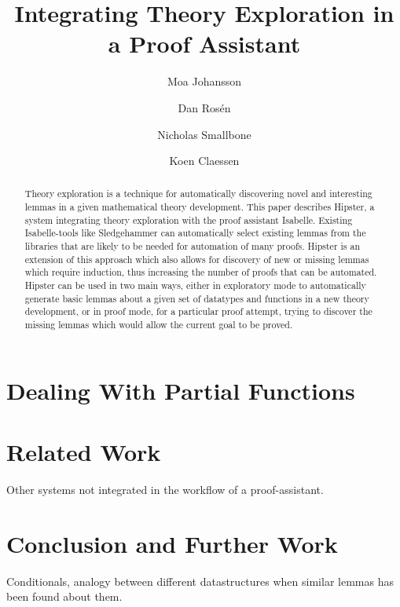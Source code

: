 \documentclass{llncs}
\begin{document}
\title{Integrating Theory Exploration in a Proof Assistant}

\author{Moa Johansson \and Dan Ros\'en \and Nicholas Smallbone \and Koen Claessen}


\maketitle

\begin{abstract}
Theory exploration is a technique for automatically discovering novel and interesting lemmas in a given mathematical theory development. This paper describes Hipster, a system integrating theory exploration with the proof assistant Isabelle.
Existing Isabelle-tools like Sledgehammer can automatically select existing lemmas from the libraries that are likely to be needed for automation of many proofs. Hipster is an extension of this approach which also allows for discovery of new or missing lemmas which require induction, thus increasing the number of proofs that can be automated.
Hipster can be used in two main ways, either in exploratory mode to automatically generate basic lemmas about a given set of datatypes and functions in a new theory development, or in proof mode, for a particular proof attempt, trying to discover the missing lemmas which would allow the current goal to be proved. 

\end{abstract}







\section{Dealing With Partial Functions}
\label{sec:partial}


\section{Related Work}
%
Other systems not integrated in the workflow of a proof-assistant. 


\section{Conclusion and Further Work}
%
Conditionals, analogy between different datastructures when similar lemmas has been found about them. 



\end{document}
